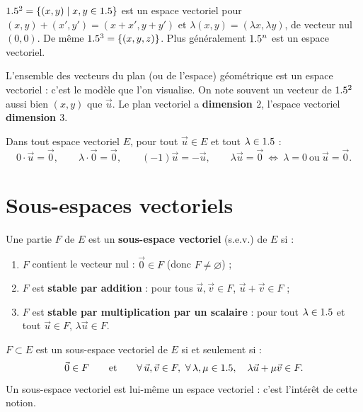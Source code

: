 \begin{exemple}
$1.5^2=\{(x,y)\mid x,y\in1.5\}$ est un espace vectoriel pour
$(x,y)+(x',y')=(x+x',y+y')$ et $\lambda(x,y)=(\lambda x,\lambda y)$, de vecteur nul $(0,0)$.
De même $1.5^3=\{(x,y,z)\}$. Plus généralement $1.5^n$ est un espace vectoriel.
\end{exemple}

\begin{remarque}
L'ensemble des vecteurs du plan (ou de l'espace) géométrique est un espace vectoriel : c'est
le modèle que l'on visualise. On note souvent un vecteur de $1.5^2$ aussi bien $(x,y)$ que
$\vec u$. Le plan vectoriel a \textbf{dimension $2$}, l'espace vectoriel \textbf{dimension $3$}.
\end{remarque}

\begin{propriete}
Dans tout espace vectoriel $E$, pour tout $\vec u\in E$ et tout $\lambda\in1.5$ :
\[
0\cdot\vec u=\vec 0,\qquad \lambda\cdot\vec 0=\vec 0,\qquad (-1)\vec u=-\vec u,\qquad
\lambda\vec u=\vec 0\ \Longleftrightarrow\ \lambda=0\ \text{ou}\ \vec u=\vec 0.
\]
\end{propriete}

\section{Sous-espaces vectoriels}

\begin{definition}
Une partie $F$ de $E$ est un \textbf{sous-espace vectoriel} (s.e.v.) de $E$ si :
\begin{enumerate}[label=\arabic*)]
\item $F$ contient le vecteur nul : $\vec 0\in F$ (donc $F\neq\varnothing$) ;
\item $F$ est \textbf{stable par addition} : pour tous $\vec u,\vec v\in F$, $\vec u+\vec v\in F$ ;
\item $F$ est \textbf{stable par multiplication par un scalaire} : pour tout $\lambda\in1.5$ et tout $\vec u\in F$, $\lambda\vec u\in F$.
\end{enumerate}
\end{definition}

\begin{theoreme}
$F\subset E$ est un sous-espace vectoriel de $E$ si et seulement si :
\[
\vec 0\in F\qquad\text{et}\qquad \forall\,\vec u,\vec v\in F,\ \forall\,\lambda,\mu\in\R,\quad \lambda\vec u+\mu\vec v\in F.
\]
Un sous-espace vectoriel est lui-même un espace vectoriel : c'est l'intérêt de cette notion.
\end{theoreme}

